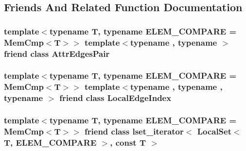 \subsection{Friends And Related Function Documentation}
\hypertarget{classshad_1_1LocalSet_af9dbb4ffd51a4c29389ab2f892cd5e82}{
\subsubsection[{Attr\-Edges\-Pair}]{\setlength{\rightskip}{0pt plus 5cm}template$<$typename T, typename E\-L\-E\-M\-\_\-\-C\-O\-M\-P\-A\-R\-E = Mem\-Cmp$<$\-T$>$$>$ template$<$typename , typename $>$ friend class {\bf Attr\-Edges\-Pair}\hspace{0.3cm}{\ttfamily [friend]}}}\label{classshad_1_1LocalSet_af9dbb4ffd51a4c29389ab2f892cd5e82}
\hypertarget{classshad_1_1LocalSet_afc8d107f39c9ea0b8848ea970eb36b93}{
\subsubsection[{Local\-Edge\-Index}]{\setlength{\rightskip}{0pt plus 5cm}template$<$typename T, typename E\-L\-E\-M\-\_\-\-C\-O\-M\-P\-A\-R\-E = Mem\-Cmp$<$\-T$>$$>$ template$<$typename , typename , typename $>$ friend class {\bf Local\-Edge\-Index}\hspace{0.3cm}{\ttfamily [friend]}}}\label{classshad_1_1LocalSet_afc8d107f39c9ea0b8848ea970eb36b93}
\hypertarget{classshad_1_1LocalSet_a7fa8272788381da5a3b8cadef548a77f}{
\subsubsection[{lset\-\_\-iterator$<$ Local\-Set$<$ T, E\-L\-E\-M\-\_\-\-C\-O\-M\-P\-A\-R\-E $>$, const T $>$}]{\setlength{\rightskip}{0pt plus 5cm}template$<$typename T, typename E\-L\-E\-M\-\_\-\-C\-O\-M\-P\-A\-R\-E = Mem\-Cmp$<$\-T$>$$>$ friend class {\bf lset\-\_\-iterator}$<$ {\bf Local\-Set}$<$ T, E\-L\-E\-M\-\_\-\-C\-O\-M\-P\-A\-R\-E $>$, const T $>$\hspace{0.3cm}{\ttfamily [friend]}}}\label{classshad_1_1LocalSet_a7fa8272788381da5a3b8cadef548a77f}
